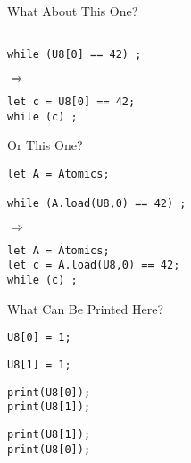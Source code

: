 \documentclass{beamer}
\begin{document}
\begin{frame}[fragile]{What About This One?}
  \begin{minipage}{.45\textwidth}
    \begin{lstlisting}

while (U8[0] == 42) ;
    \end{lstlisting}
  \end{minipage}%
  \hfill$\Rightarrow$\hfill
  \begin{minipage}{.45\textwidth}
    \begin{lstlisting}
let c = U8[0] == 42;
while (c) ;
    \end{lstlisting}
  \end{minipage}
\end{frame}

\begin{frame}[fragile]{Or This One?}
  \begin{minipage}{.45\textwidth}
    \begin{lstlisting}
let A = Atomics;

while (A.load(U8,0) == 42) ;
    \end{lstlisting}
  \end{minipage}%
  \hfill$\Rightarrow$\hfill
  \begin{minipage}{.45\textwidth}
    \begin{lstlisting}
let A = Atomics;
let c = A.load(U8,0) == 42;
while (c) ;
    \end{lstlisting}
  \end{minipage}
\end{frame}

\begin{frame}[fragile]{What Can Be Printed Here?}
  \begin{minipage}{0.2\textwidth}
  \begin{lstlisting}
U8[0] = 1;

  \end{lstlisting}
  \end{minipage}%
  \vrule\hspace{1pt}\vrule
  \begin{minipage}{0.2\textwidth}
  \begin{lstlisting}
U8[1] = 1;

  \end{lstlisting}
  \end{minipage}%
    \vrule\hspace{1pt}\vrule
  \begin{minipage}{0.25\textwidth}
  \begin{lstlisting}
print(U8[0]);
print(U8[1]);
  \end{lstlisting}
  \end{minipage}%
    \vrule\hspace{1pt}\vrule
  \begin{minipage}{0.25\textwidth}
  \begin{lstlisting}
print(U8[1]);
print(U8[0]);
  \end{lstlisting}
  \end{minipage}
\end{frame}
\end{document}
